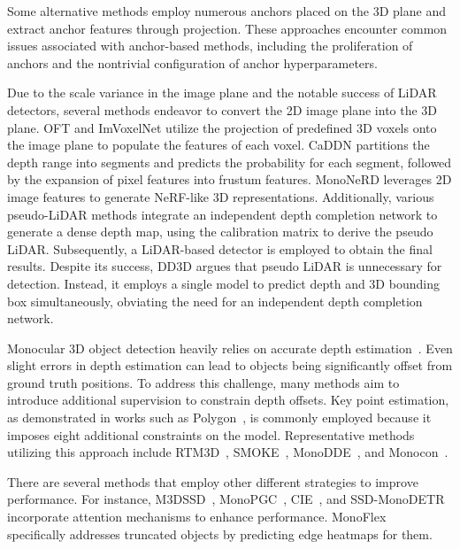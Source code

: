 \documentclass[journal]{IEEEtran}
\begin{document}
	Some alternative methods \cite{m3d-rpn, d4lcn, monodtr} employ numerous anchors placed on the 3D plane and extract anchor features through projection. These approaches encounter common issues associated with anchor-based methods, including the proliferation of anchors and the nontrivial configuration of anchor hyperparameters.
	
	Due to the scale variance in the image plane and the notable success of LiDAR detectors, several methods endeavor to convert the 2D image plane into the 3D plane. OFT \cite{oft} and ImVoxelNet \cite{imvoxelnet} utilize the projection of predefined 3D voxels onto the image plane to populate the features of each voxel. CaDDN \cite{caddn} partitions the depth range into segments and predicts the probability for each segment, followed by the expansion of pixel features into frustum features. MonoNeRD \cite{mononerd} leverages 2D image features to generate NeRF-like 3D representations. Additionally, various pseudo-LiDAR methods \cite{color-embeded, mono-plidar, patchnet} integrate an independent depth completion network to generate a dense depth map, using the calibration matrix to derive the pseudo LiDAR. Subsequently, a LiDAR-based detector is employed to obtain the final results. Despite its success, DD3D \cite{dd3d} argues that pseudo LiDAR is unnecessary for detection. Instead, it employs a single model to predict depth and 3D bounding box simultaneously, obviating the need for an independent depth completion network.
	
	Monocular 3D object detection heavily relies on accurate depth estimation~\cite{monodle}. Even slight errors in depth estimation can lead to objects being significantly offset from ground truth positions. To address this challenge, many methods aim to introduce additional supervision to constrain depth offsets. Key point estimation, as demonstrated in works such as Polygon~\cite{polygon}, is commonly employed because it imposes eight additional constraints on the model. Representative methods utilizing this approach include RTM3D~\cite{rtm3d}, SMOKE~\cite{smoke}, MonoDDE~\cite{monodde}, and Monocon~\cite{monocon}.
	
	There are several methods that employ other different strategies to improve performance. For instance, M3DSSD~\cite{m3dssd}, MonoPGC~\cite{monopgc}, CIE~\cite{cie}, and SSD-MonoDETR~\cite{ssd-monodetr} incorporate attention mechanisms to enhance performance. MonoFlex~\cite{monoflex} specifically addresses truncated objects by predicting edge heatmaps for them.
	
\end{document}
